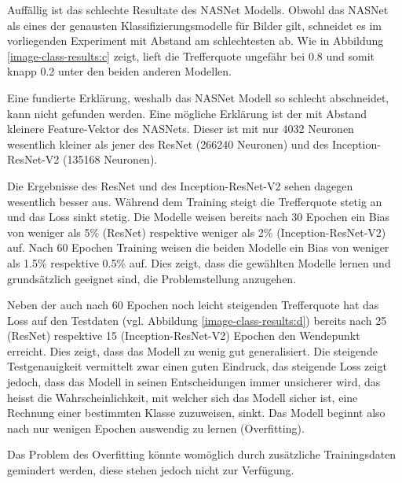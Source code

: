 
Auffällig ist das schlechte Resultate des NASNet Modells. Obwohl das NASNet als eines der genausten Klassifizierungsmodelle für Bilder gilt, schneidet es im vorliegenden Experiment mit Abstand am schlechtesten ab. Wie in Abbildung \ref{image-class-results:c} zeigt, lieft die Trefferquote ungefähr bei 0.8 und somit knapp 0.2 unter den beiden anderen Modellen.

Eine fundierte Erklärung, weshalb das NASNet Modell so schlecht abschneidet, kann nicht gefunden werden. Eine mögliche Erklärung ist der mit Abstand kleinere Feature-Vektor des NASNets. Dieser ist mit nur 4032 Neuronen wesentlich kleiner als jener des ResNet (266240 Neuronen) und des Inception-ResNet-V2 (135168 Neuronen).

Die Ergebnisse des ResNet und des Inception-ResNet-V2 sehen dagegen wesentlich besser aus. Während dem Training steigt die Trefferquote stetig an und das Loss sinkt stetig. Die Modelle weisen bereits nach 30 Epochen ein Bias von weniger als 5\% (ResNet) respektive weniger als 2\% (Inception-ResNet-V2) auf. Nach 60 Epochen Training weisen die beiden Modelle ein Bias von weniger als 1.5\% respektive 0.5\% auf. Dies zeigt, dass die gewählten Modelle lernen und grundsätzlich geeignet sind, die Problemstellung anzugehen. 

Neben der auch nach 60 Epochen noch leicht steigenden Trefferquote hat das Loss auf den Testdaten (vgl. Abbildung \ref{image-class-results:d}) bereits nach 25 (ResNet) respektive 15 (Inception-ResNet-V2) Epochen den Wendepunkt erreicht. Dies zeigt, dass das Modell zu wenig gut generalisiert. Die steigende Testgenauigkeit vermittelt zwar einen guten Eindruck, das steigende Loss zeigt jedoch, dass das Modell in seinen Entscheidungen immer unsicherer wird, das heisst die Wahrscheinlichkeit, mit welcher sich das Modell sicher ist, eine Rechnung einer bestimmten Klasse zuzuweisen, sinkt. Das Modell beginnt also nach nur wenigen Epochen auswendig zu lernen (Overfitting).

Das Problem des Overfitting könnte womöglich durch zusätzliche Trainingsdaten gemindert werden, diese stehen jedoch nicht zur Verfügung.







